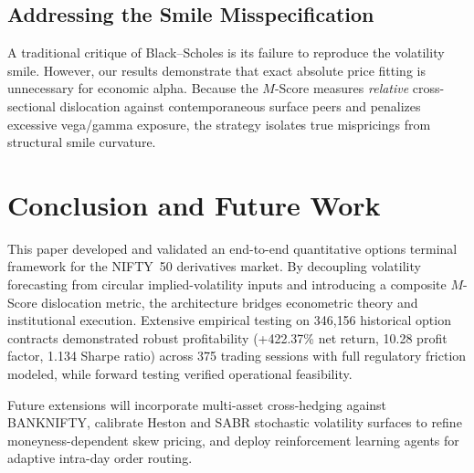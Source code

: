 \documentclass[journal]{IEEEtran}
\begin{document}
\subsection{Addressing the Smile Misspecification}
A traditional critique of Black--Scholes is its failure to reproduce the volatility smile. However, our results demonstrate that exact absolute price fitting is unnecessary for economic alpha. Because the $M$-Score measures \emph{relative} cross-sectional dislocation against contemporaneous surface peers and penalizes excessive vega/gamma exposure, the strategy isolates true mispricings from structural smile curvature.

\section{Conclusion and Future Work}

This paper developed and validated an end-to-end quantitative options terminal framework for the NIFTY~50 derivatives market. By decoupling volatility forecasting from circular implied-volatility inputs and introducing a composite $M$-Score dislocation metric, the architecture bridges econometric theory and institutional execution. Extensive empirical testing on 346{,}156 historical option contracts demonstrated robust profitability (+422.37\% net return, 10.28 profit factor, 1.134 Sharpe ratio) across 375 trading sessions with full regulatory friction modeled, while forward testing verified operational feasibility.

Future extensions will incorporate multi-asset cross-hedging against BANKNIFTY, calibrate Heston and SABR stochastic volatility surfaces to refine moneyness-dependent skew pricing, and deploy reinforcement learning agents for adaptive intra-day order routing.
\end{document}
